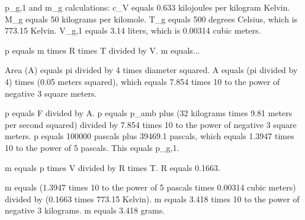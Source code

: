 p_g,1 and m_g calculations:  
c_V equals 0.633 kilojoules per kilogram Kelvin.  
M_g equals 50 kilograms per kilomole.  
T_g equals 500 degrees Celsius, which is 773.15 Kelvin.  
V_g,1 equals 3.14 liters, which is 0.00314 cubic meters.  

p equals m times R times T divided by V.  
m equals...  

Area (A) equals pi divided by 4 times diameter squared.  
A equals (pi divided by 4) times (0.05 meters squared), which equals 7.854 times 10 to the power of negative 3 square meters.  

p equals F divided by A.  
p equals p_amb plus (32 kilograms times 9.81 meters per second squared) divided by 7.854 times 10 to the power of negative 3 square meters.  
p equals 100000 pascals plus 39469.1 pascals, which equals 1.3947 times 10 to the power of 5 pascals.  
This equals p_g,1.  

m equals p times V divided by R times T.  
R equals 0.1663.  

m equals (1.3947 times 10 to the power of 5 pascals times 0.00314 cubic meters) divided by (0.1663 times 773.15 Kelvin).  
m equals 3.418 times 10 to the power of negative 3 kilograms.  
m equals 3.418 grams.